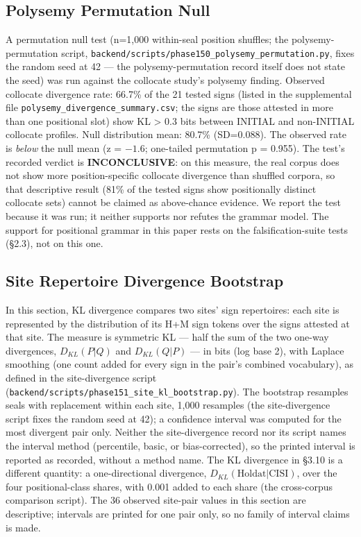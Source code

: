 \documentclass[11pt]{article}
\begin{document}
\subsection{Polysemy Permutation Null
}\label{polysemy-permutation-null-phase-150}

A permutation null test (n=1,000 within-seal position shuffles; the polysemy-permutation script, \texttt{backend/scripts/phase150\_polysemy\_permutation.py}, fixes the random seed at 42 --- the polysemy-permutation record itself does not state the seed) was run against the collocate study's polysemy finding. Observed collocate divergence rate: 66.7\% of the 21 tested signs (listed in the supplemental file \texttt{polysemy\_divergence\_summary.csv}; the signs are those attested in more than one positional slot) show KL \textgreater{} 0.3 bits between INITIAL and non-INITIAL collocate profiles. Null distribution mean: 80.7\% (SD=0.088). The observed rate is \emph{below} the null mean (z = $-1.6$; one-tailed permutation p = 0.955). The test's recorded verdict is \textbf{INCONCLUSIVE}: on this measure, the real corpus does not show more position-specific collocate divergence than shuffled corpora, so that descriptive result (81\% of the tested signs show positionally distinct collocate sets) cannot be claimed as above-chance evidence. We report the test because it was run; it neither supports nor refutes the grammar model. The support for positional grammar in this paper rests on the falsification-suite tests (§2.3), not on this one.

\subsection{Site Repertoire Divergence Bootstrap
}\label{site-repertoire-divergence-bootstrap-phase-151}

In this section, KL divergence compares two sites' sign repertoires: each site is represented by the distribution of its H+M sign tokens over the signs attested at that site. The measure is symmetric KL --- half the sum of the two one-way divergences, $D_{KL}(P|Q)$ and $D_{KL}(Q|P)$ --- in bits (log base 2), with Laplace smoothing (one count added for every sign in the pair's combined vocabulary), as defined in the site-divergence script (\texttt{backend/scripts/phase151\_site\_kl\_bootstrap.py}). The bootstrap resamples seals with replacement within each site, 1,000 resamples (the site-divergence script fixes the random seed at 42); a confidence interval was computed for the most divergent pair only. Neither the site-divergence record nor its script names the interval method (percentile, basic, or bias-corrected), so the printed interval is reported as recorded, without a method name. The KL divergence in §3.10 is a different quantity: a one-directional divergence, $D_{KL}(\text{Holdat}|\text{CISI})$, over the four positional-class shares, with 0.001 added to each share (the cross-corpus comparison script). The 36 observed site-pair values in this section are descriptive; intervals are printed for one pair only, so no family of interval claims is made.
\end{document}
